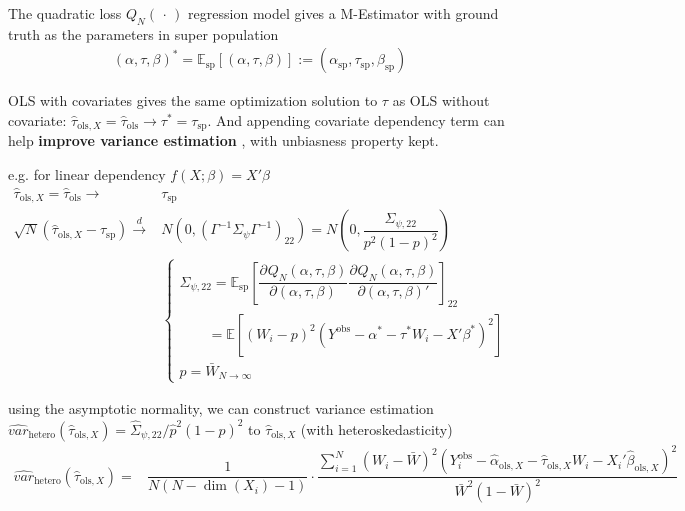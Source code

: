 \begin{itemize}[topsep=2pt,itemsep=0pt]
    The quadratic loss $ Q_N(\, \cdot \, ) $ regression model gives a M-Estimator with ground truth as the parameters in super population
    \begin{align}
        (\alpha ,\tau,\beta )^*=\mathbb{E}_\mathrm{sp} \left[ (\alpha ,\tau,\beta ) \right]  := (\alpha_\mathrm{sp}  ,\tau_\mathrm{sp},\beta_\mathrm{sp} )
    \end{align}

    OLS with covariates gives the same optimization solution to $ \tau $ as OLS without covariate: $ \hat{\tau}_{\mathrm{ols},X }=\hat{\tau}_\mathrm{ols}\to \tau^*=\tau_\mathrm{sp}  $. And appending covariate dependency term can help \textbf{improve variance estimation} , with unbiasness property kept. 

    e.g. for linear dependency $ f(X;\beta )=X'\beta  $
    \begin{align}
        \hat{\tau}_{\mathrm{ols},X }=\hat{\tau}_{\mathrm{ols} }\to&\tau_\mathrm{sp}\\
        \sqrt{N}(\hat{\tau}_{\mathrm{ols},X }-\tau_\mathrm{sp} )  \xrightarrow[]{d} & N\left(0,(\Gamma ^{-1}\Sigma _{\psi}\Gamma ^{-1})_{22}\right)=N\left(0,\dfrac{\Sigma _{\psi,22}}{p^2(1-p)^2}\right)\\
        &\begin{cases}
            \Sigma _{\psi,22}=\mathbb{E}_\mathrm{sp} \left[\dfrac{\partial^{} Q_N(\alpha ,\tau,\beta )}{\partial (\alpha ,\tau,\beta )^{}}
            \dfrac{\partial^{} Q_N(\alpha ,\tau,\beta )}{\partial (\alpha ,\tau,\beta )'}\right]_{22}\\
            \qquad =\mathbb{E}\left[ (W_i-p)^2\left(Y^\mathrm{obs}-\alpha ^*-\tau^*W_i-X'\beta ^* \right)^2 \right] \\
            p=\bar{W}_{N\to\infty }
        \end{cases}
    \end{align}

    using the asymptotic normality, we can construct variance estimation $ \hat{var}_\mathrm{hetero} (\hat{\tau}_{\mathrm{ols} ,X})=\hat{\Sigma }_{\psi,22}\big/ \hat{p}^2(1-\hat{p})^2 $ to $ \hat{\tau}_{\mathrm{ols} ,X} $ (with heteroskedasticity)
    \begin{align}
        \hat{var}_\mathrm{hetero} (\hat{\tau}_{\mathrm{ols} ,X}) = & \dfrac{1}{N(N-\dim(X_i)-1)}\cdot\dfrac{\sum_{i=1}^N(W_i-\bar{W})^2\left(Y_i^\mathrm{obs}-\hat{\alpha}_{\mathrm{ols} ,X}-\hat{\tau}_{\mathrm{ols} ,X}W_i-X_i'\hat{\beta }_{\mathrm{ols} ,X} \right)^2}{\bar{W}^2\left(1-\bar{W}\right)^2}
    \end{align}
    
\end{itemize}

